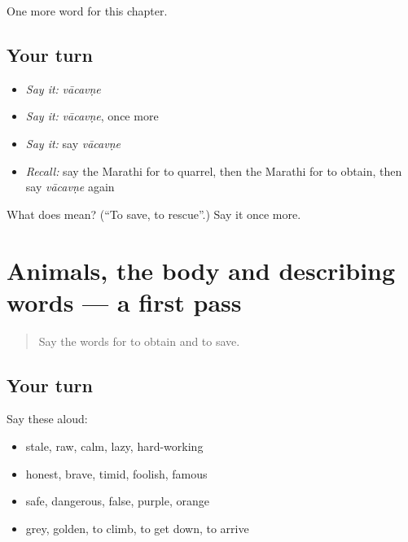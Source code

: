 \begin{grammarlens}[title={What you've built}]
One more word for this chapter.
\end{grammarlens}

\subsection*{Your turn}
\begin{itemize}
\raggedright
  \item \emph{Say it:} \emph{vācavṇe}
  \item \emph{Say it:} \emph{vācavṇe}, once more
  \item \emph{Say it:} say \emph{vācavṇe}
  \item \emph{Recall:} say the Marathi for to quarrel, then the Marathi for to obtain, then say \emph{vācavṇe} again
\end{itemize}

\begin{tcolorbox}[breakable,colback=teal!4,colframe=teal!35!black,title={Before you move on}]
What does  mean? (\textquotedblleft{}To save, to rescue\textquotedblright{}.) Say it once more.
\end{tcolorbox}
\section[(dialogue)]{Animals, the body and describing words — a first pass}

\label{lesson:MR-R158-first-pass-animals-the-body-and-describing-words}



\begin{quote}
Say the words for to obtain and to save.
\end{quote}

\subsection*{Your turn}
Say these aloud:

\begin{itemize}
\raggedright
  \item stale, raw, calm, lazy, hard-working
  \item honest, brave, timid, foolish, famous
  \item safe, dangerous, false, purple, orange
  \item grey, golden, to climb, to get down, to arrive
\end{itemize}

